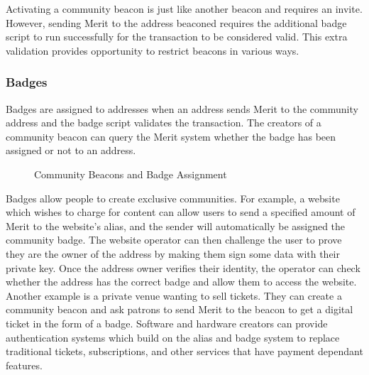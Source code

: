 \documentclass{article}
\begin{document}
Activating a community beacon is just like another beacon and requires an invite.
However, sending Merit to the address beaconed requires the additional badge script to
run successfully for the transaction to be considered valid. This extra validation
provides opportunity to restrict beacons in various ways.

\subsubsection{Badges}

Badges are assigned to addresses when an address sends Merit to the community address
and the badge script validates the transaction. The creators of a community beacon
can query the Merit system whether the badge has been assigned or not to an address.

\begin{figure}[H]
    \begin{center}
    \end{center}
    \caption{Community Beacons and Badge Assignment}
\end{figure}

Badges allow people to create exclusive communities. For example, a website
which wishes to charge for content can allow users to send a specified amount
of Merit to the website's alias, and the sender will automatically be assigned the
community badge. The website operator can then challenge the user to prove they
are the owner of the address by making them sign some data with their private
key. Once the address owner verifies their identity, the operator can check 
whether the address has the correct badge and allow them to access the website.
Another example is a private venue wanting to sell tickets. They can create a 
community beacon and ask patrons to send Merit to the beacon to get a digital
ticket in the form of a badge. Software and hardware creators can provide
authentication systems which build on the alias and badge system to replace
traditional tickets, subscriptions, and other services that have payment dependant
features.
\end{document}
